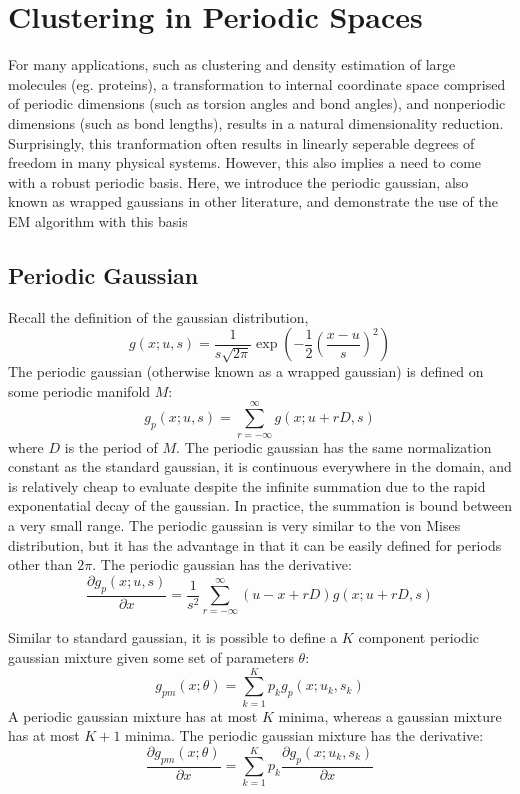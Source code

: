\documentclass{acm_proc_article-sp}
\begin{document}
\section{Clustering in Periodic Spaces}

For many applications, such as clustering and density estimation of large molecules (eg. proteins), a transformation to internal coordinate space comprised of periodic dimensions (such as torsion angles and bond angles), and nonperiodic dimensions (such as bond lengths), results in a natural dimensionality reduction. Surprisingly, this tranformation often results in linearly seperable degrees of freedom in many physical systems. However, this also implies a need to come with a robust periodic basis. Here, we introduce the periodic gaussian, also known as wrapped gaussians in other literature, and demonstrate the use of the EM algorithm with this basis

\subsection{Periodic Gaussian}
Recall the definition of the gaussian distribution,
\begin{equation}
g(x; u,s) = \dfrac{1}{s\sqrt{2\pi}} \exp\left(-\dfrac{1}{2} \left(\dfrac{x-u}{s}\right)^2\right)
\end{equation}
The periodic gaussian (otherwise known as a wrapped gaussian) is defined on some periodic manifold \textbf{$M$}:
\begin{equation}
g_p(x; u,s) = \sum_{r=-\infty}^{\infty} g(x; u+rD, s)
\end{equation}
where \textbf{$D$} is the period of \textbf{$M$}. The periodic gaussian has the same normalization constant as the standard gaussian, it is continuous everywhere in the domain, and is relatively cheap to evaluate despite the infinite summation due to the rapid exponentatial decay of the gaussian. In practice, the summation is bound between a very small range. The periodic gaussian is very similar to the von Mises distribution, but it has the advantage in that it can be easily defined for periods other than \textbf{$2\pi$}. The periodic gaussian has the derivative:
\begin{equation}
\dfrac{\partial g_p(x;u,s)}{\partial x} = \dfrac{1}{s^2} \sum_{r=-\infty}^{\infty} (u-x+rD) g(x; u+rD, s)
\end{equation}

Similar to standard gaussian, it is possible to define a \textbf{$K$} component periodic gaussian mixture given some set of parameters \textbf{$\theta$}:
\begin{equation}
g_{pm}(x;\theta) = \sum_{k=1}^{K} p_k g_p(x; u_k, s_k)
\end{equation}
A periodic gaussian mixture has at most \textbf{$K$} minima, whereas a gaussian mixture has at most \textbf{$K+1$} minima. The periodic gaussian mixture has the derivative:
\begin{equation}
\dfrac{\partial g_{pm}(x; \theta)}{\partial x} =  \sum_{k=1}^{K} p_k \dfrac{\partial g_p(x; u_k, s_k)}{\partial x}
\end{equation}
\end{document}
